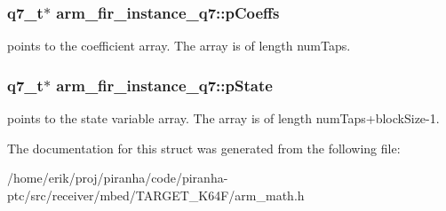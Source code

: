 \subsubsection[{\texorpdfstring{p\+Coeffs}{pCoeffs}}]{\setlength{\rightskip}{0pt plus 5cm}q7\+\_\+t$\ast$ arm\+\_\+fir\+\_\+instance\+\_\+q7\+::p\+Coeffs}\hypertarget{structarm__fir__instance__q7_a0e45aedefc3fffad6cb315c5b6e5bd49}{}\label{structarm__fir__instance__q7_a0e45aedefc3fffad6cb315c5b6e5bd49}
points to the coefficient array. The array is of length num\+Taps. 
\subsubsection[{\texorpdfstring{p\+State}{pState}}]{\setlength{\rightskip}{0pt plus 5cm}q7\+\_\+t$\ast$ arm\+\_\+fir\+\_\+instance\+\_\+q7\+::p\+State}\hypertarget{structarm__fir__instance__q7_aaddea3b9c7e16ddfd9428b7bf9f9c200}{}\label{structarm__fir__instance__q7_aaddea3b9c7e16ddfd9428b7bf9f9c200}
points to the state variable array. The array is of length num\+Taps+block\+Size-\/1. 

The documentation for this struct was generated from the following file\+:\begin{DoxyCompactItemize}
\item 
/home/erik/proj/piranha/code/piranha-\/ptc/src/receiver/mbed/\+T\+A\+R\+G\+E\+T\+\_\+\+K64\+F/arm\+\_\+math.\+h\end{DoxyCompactItemize}
